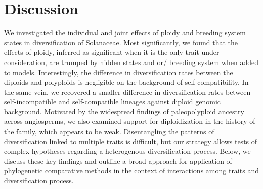 \section{Discussion}

%
%
% 
%

We investigated the individual and joint effects of ploidy and breeding system states in diversification of Solanaceae.
Most significantly, we found that the effects of ploidy, inferred as significant when it is the only trait under consideration, are trumped by hidden states and or/ breeding system when added to models.  %
Interestingly, the difference in diversification rates between the diploids and polyploids is negligible on the background of self-compatibility.
In the same vein, we recovered a smaller difference in diversification rates between self-incompatible and self-compatible lineages against diploid genomic background. %
Motivated by the widespread findings of paleopolyploid ancestry across angiosperms, we also examined support for diploidization in the history of the family, which appears to be weak. %
Disentangling the patterns of diversification linked to multiple traits is difficult, but our strategy allows tests of complex hypotheses regarding a heterogenous diversification process.
Below, we discuss these key findings and outline a broad approach for application of phylogenetic comparative methods in the context of interactions among traits and diversification process. 


